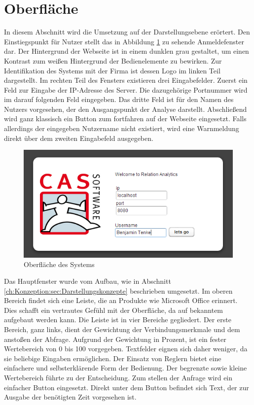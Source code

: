 \section{Oberfläche}

In diesem Abschnitt wird die Umsetzung auf der Darstellungsebene erörtert. Den Einstiegspunkt für Nutzer stellt das in Abbildung \ref{ergebniss_oberflaeche_anmeld} zu sehende Anmeldefenster dar. Der Hintergrund der Webseite ist in einem dunklen grau gestaltet, um einen Kontrast zum weißen Hintergrund der Bedienelemente zu bewirken. Zur Identifikation des Systems mit der Firma ist dessen Logo im linken Teil dargestellt. Im rechten Teil des Fensters existieren drei Eingabefelder. Zuerst ein Feld zur Eingabe der IP-Adresse des Server. Die dazugehörige Portnummer wird im darauf folgenden Feld eingegeben. Das dritte Feld ist für den Namen des Nutzers vorgesehen, der den Ausgangspunkt der Analyse darstellt. Abschließend wird ganz klassisch ein Button zum fortfahren auf der Webseite eingesetzt. Falls allerdings der eingegeben Nutzername nicht existiert, wird eine Warnmeldung direkt über dem zweiten Eingabefeld ausgegeben. 

\begin{figure}[htbp]
\centering
\includegraphics[scale=2.0]{pics/login.png}
\caption{Oberfläche des Systems}
\label{ergebniss_oberflaeche_anmeld}
\end{figure}

Das Hauptfenster wurde vom Aufbau, wie in Abschnitt \ref{ch:Konzeption:sec:Darstellungskonzepte} beschrieben umgesetzt. Im oberen Bereich findet sich eine Leiste, die an Produkte wie Microsoft Office erinnert. Dies schafft ein vertrautes Gefühl mit der Oberfläche, da auf bekanntem aufgebaut werden kann. Die Leiste ist in vier Bereiche gegliedert. Der erste Bereich, ganz links, dient der Gewichtung der Verbindungsmerkmale und dem anstoßen der Abfrage. Aufgrund der Gewichtung in Prozent, ist ein fester Wertebereich von 0 bis 100 vorgegeben. Textfelder eignen sich daher weniger, da sie beliebige Eingaben ermöglichen. Der Einsatz von Reglern bietet eine einfachere und selbsterklärende Form der Bedienung. Der begrenzte sowie kleine Wertebereich führte zu der Entscheidung. Zum stellen der Anfrage wird ein einfacher Button eingesetzt. Direkt unter dem Button befindet sich Text, der zur Ausgabe der benötigten Zeit vorgesehen ist. 

